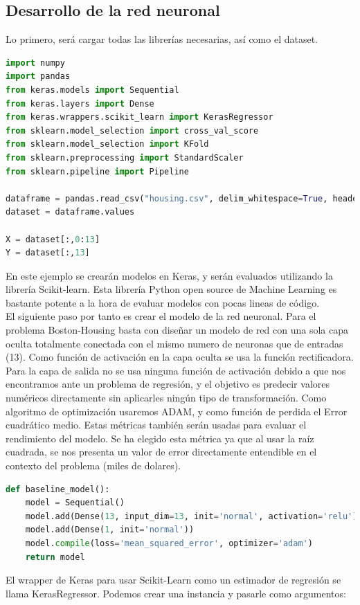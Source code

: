 \subsection{Desarrollo de la red neuronal}
Lo primero, será cargar todas las librerías necesarias, así como el dataset.
\begin{lstlisting}[language=Python]
import numpy
import pandas
from keras.models import Sequential
from keras.layers import Dense
from keras.wrappers.scikit_learn import KerasRegressor
from sklearn.model_selection import cross_val_score
from sklearn.model_selection import KFold
from sklearn.preprocessing import StandardScaler
from sklearn.pipeline import Pipeline

dataframe = pandas.read_csv("housing.csv", delim_whitespace=True, header=None)
dataset = dataframe.values

X = dataset[:,0:13]
Y = dataset[:,13]
\end{lstlisting}
En este ejemplo se crearán modelos en Keras, y serán evaluados utilizando la librería Scikit-learn. Esta librería Python open source de Machine Learning es bastante potente a la hora de evaluar modelos con pocas lineas de código.\\
El siguiente paso por tanto es crear el modelo de la red neuronal. Para el problema Boston-Housing basta con diseñar un modelo de red con una sola capa oculta totalmente conectada con el mismo numero de neuronas que de entradas (13). Como función de activación en la capa oculta se usa la función rectificadora. Para la capa de salida no se usa ninguna función de activación debido a que nos encontramos ante un problema de regresión, y el objetivo es predecir valores numéricos directamente sin aplicarles ningún tipo de transformación. Como algoritmo de optimización usaremos ADAM, y como función de perdida el Error cuadrático medio. Estas métricas también serán usadas para evaluar el rendimiento del modelo. Se ha elegido esta métrica ya que al usar la raíz cuadrada, se nos presenta un valor de error directamente entendible en el contexto del problema (miles de dolares).
\begin{lstlisting}[language=Python]
def baseline_model():
	model = Sequential()
	model.add(Dense(13, input_dim=13, init='normal', activation='relu'))
	model.add(Dense(1, init='normal'))
	model.compile(loss='mean_squared_error', optimizer='adam')
	return model
\end{lstlisting}
El wrapper de Keras para usar Scikit-Learn como un estimador de regresión se llama KerasRegressor. Podemos crear una instancia y pasarle como argumentos:\\
